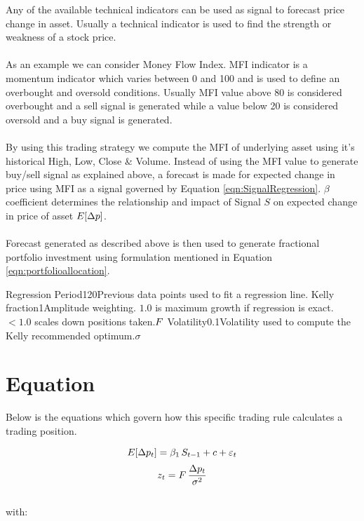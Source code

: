 \documentclass{article}
\begin{document}
\logo
{} %
\tblofcontents


\howtotrade
{Any of the available technical indicators can be used as signal to forecast price change in asset. Usually a technical indicator is used to find the strength or weakness of a stock price. \\ \\ As an example we can consider Money Flow Index. MFI indicator is a momentum indicator which varies between 0 and 100 and is used to define an overbought and oversold conditions. Usually MFI value above 80 is considered overbought and a sell signal is generated while a value below 20 is considered oversold and a buy signal is generated.\\ \\
By using this trading strategy we compute the MFI of underlying asset using it's historical High, Low, Close \& Volume. Instead of using the MFI value to generate buy/sell signal as explained above, a forecast is made for expected change in price using MFI as a signal governed by Equation \ref{eqn:SignalRegression}. $\beta$ coefficient determines the relationship and impact of Signal $S$ on expected change in price of asset $E[\Delta p]$.\\ \\
Forecast generated as described above is then used to generate fractional portfolio investment using formulation mentioned in Equation \ref{eqn:portfolioallocation}.
}

{Regression Period}{120}{Previous data points used to fit a regression line.}{\lookbacklength}
{Kelly fraction}{1}{Amplitude weighting. $1.0$ is maximum growth if regression is exact.
$<1.0$ scales down positions taken.}{$F$}
{Volatility}{0.1}{Volatility used to compute the Kelly recommended optimum.}{$\sigma$}
\stoptable %

\section{Equation}
Below is the equations which govern how this specific trading rule calculates a trading position.

\begin{equation}
\label{eqn:SignalRegression}
E[\Delta p_{t}] = \beta_{1} \, S_{t-1} + c + \varepsilon_{t}
\end{equation}
\begin{equation}
\label{eqn:portfolioallocation}
    z_{t} = F \, \frac{\Delta p_{t}}{\sigma^{2}}
\end{equation}
\\
with:
\end{document}
